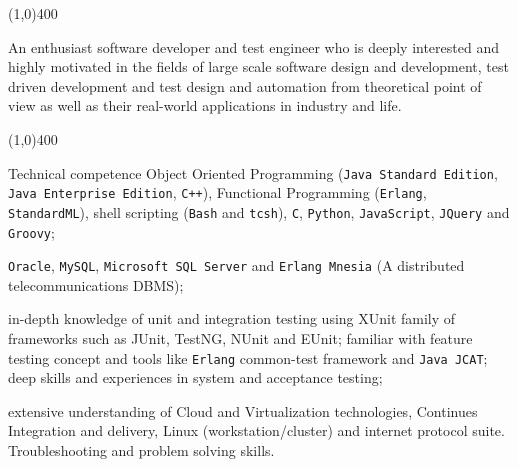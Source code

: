 \documentclass{resume}
\author{Amin Khorsandi}
\begin{document}
\maketitle

\begin{center}
\line(1,0){400}
\end{center}

\par \begin{flushleft}An enthusiast software developer and test engineer
who is deeply interested and highly motivated in the fields of large scale software design and development, 
test driven development and test design and automation from theoretical point of view as well as 
their real-world applications in industry and life.
\end{flushleft}

\begin{center}
\line(1,0){400}
\end{center}

\begin{category}{Technical competence}
\hspace{1 mm}Object Oriented Programming 
(\texttt{Java Standard Edition}, \texttt{Java Enterprise Edition}, \texttt{C++}), 
Functional Programming (\texttt{Erlang}, \texttt{StandardML}), 
shell scripting (\texttt{Bash} and \texttt{tcsh}), \texttt{C}, \texttt{Python}, 
\texttt{JavaScript}, \texttt{JQuery} and \texttt{Groovy};

\hspace{1 mm}\texttt{Oracle}, \texttt{MySQL}, \texttt{Microsoft SQL Server} 
and \texttt{Erlang Mnesia} (A distributed telecommunications DBMS);

\hspace{1 mm}in-depth knowledge of unit and integration 
testing using XUnit family of frameworks such as JUnit, TestNG, NUnit and EUnit; familiar with feature 
testing concept and tools like \texttt{Erlang} common-test framework and \texttt{Java JCAT}; 
deep skills and experiences in system and acceptance testing;

\hspace{1 mm}extensive understanding of Cloud and Virtualization technologies, 
Continues Integration and delivery, Linux (workstation/cluster) and internet protocol suite.
Troubleshooting and problem solving skills.

\end{category}
\end{document}
